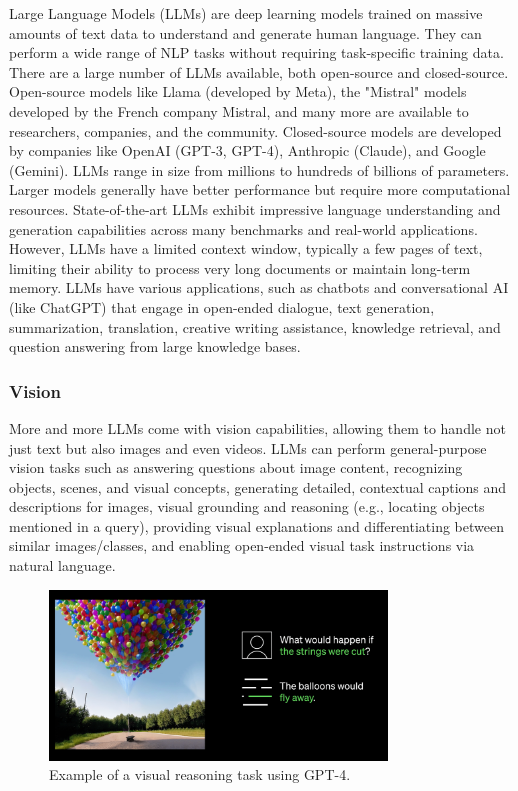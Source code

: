 \documentclass{article}
\begin{document}
Large Language Models (LLMs) are deep learning models trained on massive
amounts of text data to understand and generate human language. They can
perform a wide range of NLP tasks without requiring task-specific training data.
There are a large number of LLMs available, both open-source and closed-source.
Open-source models like Llama (developed by Meta), the "Mistral" models
developed by the French company Mistral, and many more are available to
researchers, companies, and the community. Closed-source models are
developed by companies like OpenAI (GPT-3, GPT-4), Anthropic (Claude),
and Google (Gemini).
LLMs range in size from millions to hundreds of billions of parameters. %
Larger models generally have better performance but require more computational
resources. State-of-the-art LLMs exhibit impressive language understanding
and generation capabilities across many benchmarks and real-world
applications. However, LLMs have a limited context window, typically
a few pages of text, limiting their ability to process very long documents
or maintain long-term memory.
LLMs have various applications, such as chatbots and conversational AI
(like ChatGPT) that engage in open-ended dialogue, text generation,
summarization, translation, creative writing assistance, knowledge
retrieval, and question answering from large knowledge bases.

\subsubsection{Vision}

More and more LLMs come with vision capabilities, allowing them to handle not just text but also images and even videos.
LLMs can perform general-purpose vision tasks such as answering questions about image content,
recognizing objects, scenes, and visual concepts, generating detailed, contextual captions
and descriptions for images, visual grounding and reasoning (e.g., locating objects mentioned in a query),
providing visual explanations and differentiating between
similar images/classes, and enabling open-ended visual
task instructions via natural language.


\begin{figure}
    \centering
    \includegraphics[width=0.8\textwidth]{images/gpt4-image-description.png}
    \caption{Example of a visual reasoning task using GPT-4.}
\end{figure}
\end{document}
